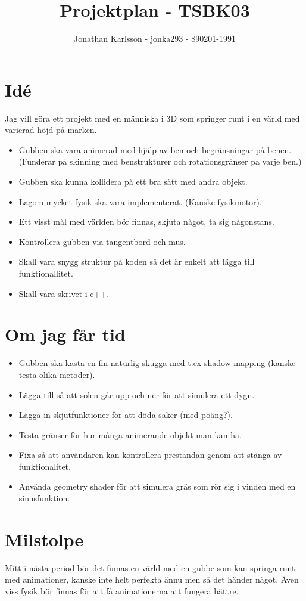 \documentclass[a4paper]{article}
\author{Jonathan Karlsson - jonka293 - 890201-1991}
\title{Projektplan - TSBK03}
\begin{document}
	
	\maketitle

	\section{Idé}
	Jag vill göra ett projekt med en människa i 3D som springer runt i en värld med varierad höjd på marken. 
	\begin{itemize}
	\item Gubben ska vara animerad med hjälp av ben och begränsningar på benen. (Funderar på skinning med benstrukturer och rotationsgränser på varje ben.)
	\item Gubben ska kunna kollidera på ett bra sätt med andra objekt.
	\item Lagom mycket fysik ska vara implementerat. (Kanske fysikmotor).
	\item Ett visst mål med världen bör finnas, skjuta något, ta sig någonstans.
	\item Kontrollera gubben via tangentbord och mus.
	\item Skall vara snygg struktur på koden så det är enkelt att lägga till funktionallitet.
	\item Skall vara skrivet i c++.
	\end{itemize}

	\section{Om jag får tid}
	\begin{itemize}
	\item Gubben ska kasta en fin naturlig skugga med t.ex shadow mapping (kanske testa olika metoder).
	\item Lägga till så att solen går upp och ner för att simulera ett dygn.
	\item Lägga in skjutfunktioner för att döda saker (med poäng?).
	\item Testa gränser för hur många animerande objekt man kan ha.
	\item Fixa så att användaren kan kontrollera prestandan genom att stänga av funktionalitet.
	\item Använda geometry shader för att simulera gräs som rör sig i vinden med en sinusfunktion. 
	\end{itemize}

	\section{Milstolpe}
	Mitt i nästa period bör det finnas en värld med en gubbe som kan springa runt med animationer, kanske inte helt perfekta ännu men så det händer något. Även viss fysik bör finnas för att få animationerna att fungera bättre.
	
\end{document}
